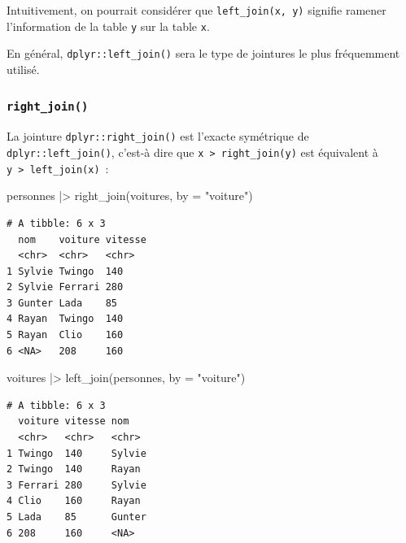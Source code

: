 \documentclass[
  letterpaper,
  DIV=11,
  numbers=noendperiod,
  oneside]{scrreprt}
\newenvironment{Shaded}{\begin{snugshade}}{\end{snugshade}}
\newcommand{\AttributeTok}[1]{\textcolor[rgb]{0.40,0.45,0.13}{#1}}
\newcommand{\FunctionTok}[1]{\textcolor[rgb]{0.28,0.35,0.67}{#1}}
\newcommand{\NormalTok}[1]{\textcolor[rgb]{0.00,0.23,0.31}{#1}}
\newcommand{\SpecialCharTok}[1]{\textcolor[rgb]{0.37,0.37,0.37}{#1}}
\newcommand{\StringTok}[1]{\textcolor[rgb]{0.13,0.47,0.30}{#1}}
\begin{document}
Intuitivement, on pourrait considérer que \texttt{left\_join(x,\ y)}
signifie ramener l'information de la table \texttt{y} sur la table
\texttt{x}.

En général, \texttt{dplyr::left\_join()} sera le type de jointures le
plus fréquemment utilisé.

\hypertarget{right_join}{%
\subsubsection{\texorpdfstring{\texttt{right\_join()}}{right\_join()}}\label{right_join}}

La jointure \texttt{dplyr::right\_join()} est l'exacte symétrique de
\texttt{dplyr::left\_join()}, c'est-à dire que
\texttt{x\ \textbar{}\textgreater{}\ right\_join(y)} est
équivalent à
\texttt{y\ \textbar{}\textgreater{}\ left\_join(x)}~:

\begin{Shaded}
\begin{Highlighting}[]
\NormalTok{personnes }\SpecialCharTok{|\textgreater{}} \FunctionTok{right\_join}\NormalTok{(voitures, }\AttributeTok{by =} \StringTok{"voiture"}\NormalTok{)}
\end{Highlighting}
\end{Shaded}

\begin{verbatim}
# A tibble: 6 x 3
  nom    voiture vitesse
  <chr>  <chr>   <chr>  
1 Sylvie Twingo  140    
2 Sylvie Ferrari 280    
3 Gunter Lada    85     
4 Rayan  Twingo  140    
5 Rayan  Clio    160    
6 <NA>   208     160    
\end{verbatim}

\begin{Shaded}
\begin{Highlighting}[]
\NormalTok{voitures }\SpecialCharTok{|\textgreater{}} \FunctionTok{left\_join}\NormalTok{(personnes, }\AttributeTok{by =} \StringTok{"voiture"}\NormalTok{)}
\end{Highlighting}
\end{Shaded}

\begin{verbatim}
# A tibble: 6 x 3
  voiture vitesse nom   
  <chr>   <chr>   <chr> 
1 Twingo  140     Sylvie
2 Twingo  140     Rayan 
3 Ferrari 280     Sylvie
4 Clio    160     Rayan 
5 Lada    85      Gunter
6 208     160     <NA>  
\end{verbatim}
\end{document}
